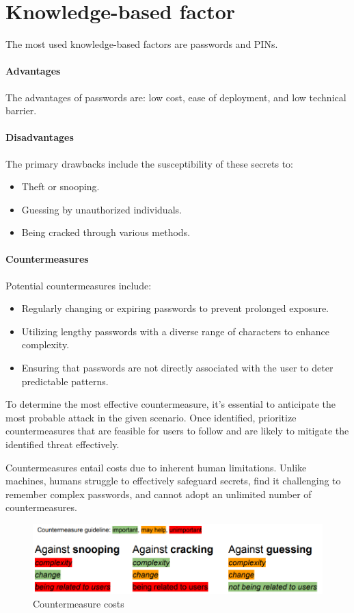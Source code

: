 \section{Knowledge-based factor}

The most used knowledge-based factors are passwords and PINs. 

\paragraph*{Advantages}
The advantages of passwords are: low cost, ease of deployment, and low technical barrier. 

\paragraph*{Disadvantages}
The primary drawbacks include the susceptibility of these secrets to:
\begin{itemize}
    \item Theft or snooping.
    \item Guessing by unauthorized individuals.
    \item Being cracked through various methods.
\end{itemize}

\paragraph*{Countermeasures}
Potential countermeasures include:
\begin{itemize}
    \item Regularly changing or expiring passwords to prevent prolonged exposure.
    \item Utilizing lengthy passwords with a diverse range of characters to enhance complexity.
    \item Ensuring that passwords are not directly associated with the user to deter predictable patterns.
\end{itemize}
To determine the most effective countermeasure, it's essential to anticipate the most probable attack in the given scenario.
Once identified, prioritize countermeasures that are feasible for users to follow and are likely to mitigate the identified threat effectively.

Countermeasures entail costs due to inherent human limitations. 
Unlike machines, humans struggle to effectively safeguard secrets, find it challenging to remember complex passwords, and cannot adopt an unlimited number of countermeasures.
\begin{figure}[H]
    \centering
    \includegraphics[width=0.75\linewidth]{images/auth1.png}
    \caption{Countermeasure costs}
\end{figure}

